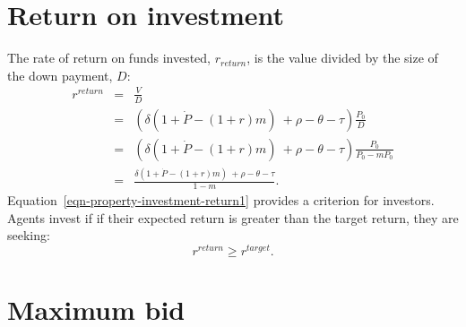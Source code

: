 
\section{Return on investment}

The rate of return on funds invested, $r_{return}$, is the value divided by the size of the down payment, $D$: 
\begin{eqnarray}
r^{return} 
  &=& \frac{V}{D}  \nonumber \\
  &=& \left(\delta \left(1+\dot P - (1+r)m\right) \ + \rho - \theta - \tau \right) \frac{P_0}{D}        \nonumber \\
  &=& \left(\delta \left(1+\dot P - (1+r)m\right) \ + \rho - \theta - \tau \right) \frac{P_0}{P_0-mP_0} \nonumber \\ 
  &=& \frac{\delta \left(1+\dot P - (1+r)m\right) \ + \rho - \theta - \tau }{1-m}.
\label{eqn-property-investment-return1}
\end{eqnarray}
Equation~\ref{eqn-property-investment-return1} provides a criterion for investors. Agents invest if if their expected return is greater than the target return, they are seeking:
\begin{equation}
r^{return} \geq r^{target}. 
\label{eqn-property-investment-return2}
\end{equation}

\section{Maximum bid} %

